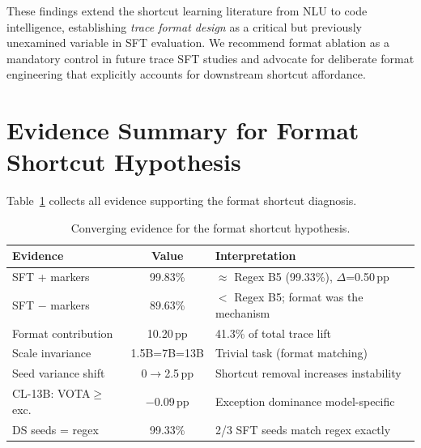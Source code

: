 \documentclass[11pt,a4paper]{article}
\newcommand{\pp}{\,\text{pp}}
\begin{document}
These findings extend the shortcut learning literature from NLU to code intelligence, establishing \emph{trace format design} as a critical but previously unexamined variable in SFT evaluation.
We recommend format ablation as a mandatory control in future trace SFT studies and advocate for deliberate format engineering that explicitly accounts for downstream shortcut affordance.



\appendix

\section{Evidence Summary for Format Shortcut Hypothesis}
\label{app:evidence}

Table~\ref{tab:evidence} collects all evidence supporting the format shortcut diagnosis.

\begin{table}[h]
\centering
\small
\begin{tabular}{lcp{4.8cm}}
\toprule
\textbf{Evidence} & \textbf{Value} & \textbf{Interpretation} \\
\midrule
SFT + markers & 99.83\% & $\approx$ Regex B5 (99.33\%), $\Delta$=0.50$\pp$ \\
SFT $-$ markers & 89.63\% & $<$ Regex B5; format was the mechanism \\
Format contribution & 10.20$\pp$ & 41.3\% of total trace lift \\
Scale invariance & 1.5B=7B=13B & Trivial task (format matching) \\
Seed variance shift & 0$\to$2.5$\pp$ & Shortcut removal increases instability \\
CL-13B: VOTA$\geq$exc. & $-$0.09$\pp$ & Exception dominance model-specific \\
DS seeds = regex & 99.33\% & 2/3 SFT seeds match regex exactly \\
\bottomrule
\end{tabular}
\caption{Converging evidence for the format shortcut hypothesis.}
\label{tab:evidence}
\end{table}
\end{document}
